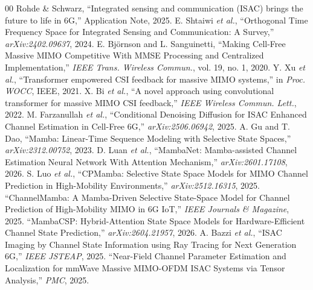 \documentclass[conference]{IEEEtran}
\begin{document}
\begin{thebibliography}{00}
 Rohde \& Schwarz, ``Integrated sensing and communication (ISAC) brings the future to life in 6G,'' Application Note, 2025.
 E. Shtaiwi \textit{et al.}, ``Orthogonal Time Frequency Space for Integrated Sensing and Communication: A Survey,'' \textit{arXiv:2402.09637}, 2024.
 E. Bj\"ornson and L. Sanguinetti, ``Making Cell-Free Massive MIMO Competitive With MMSE Processing and Centralized Implementation,'' \textit{IEEE Trans. Wireless Commun.}, vol. 19, no. 1, 2020.
 Y. Xu \textit{et al.}, ``Transformer empowered CSI feedback for massive MIMO systems,'' in \textit{Proc. WOCC}, IEEE, 2021.
 X. Bi \textit{et al.}, ``A novel approach using convolutional transformer for massive MIMO CSI feedback,'' \textit{IEEE Wireless Commun. Lett.}, 2022.
 M. Farzanullah \textit{et al.}, ``Conditional Denoising Diffusion for ISAC Enhanced Channel Estimation in Cell-Free 6G,'' \textit{arXiv:2506.06942}, 2025.
 A. Gu and T. Dao, ``Mamba: Linear-Time Sequence Modeling with Selective State Spaces,'' \textit{arXiv:2312.00752}, 2023.
 D. Luan \textit{et al.}, ``MambaNet: Mamba-assisted Channel Estimation Neural Network With Attention Mechanism,'' \textit{arXiv:2601.17108}, 2026.
 S. Luo \textit{et al.}, ``CPMamba: Selective State Space Models for MIMO Channel Prediction in High-Mobility Environments,'' \textit{arXiv:2512.16315}, 2025.
 ``ChannelMamba: A Mamba-Driven Selective State-Space Model for Channel Prediction of High-Mobility MIMO in 6G IoT,'' \textit{IEEE Journals \& Magazine}, 2025.
 ``MambaCSP: Hybrid-Attention State Space Models for Hardware-Efficient Channel State Prediction,'' \textit{arXiv:2604.21957}, 2026.
 A. Bazzi \textit{et al.}, ``ISAC Imaging by Channel State Information using Ray Tracing for Next Generation 6G,'' \textit{IEEE JSTEAP}, 2025.
 ``Near-Field Channel Parameter Estimation and Localization for mmWave Massive MIMO-OFDM ISAC Systems via Tensor Analysis,'' \textit{PMC}, 2025.
\end{thebibliography}
\end{document}
